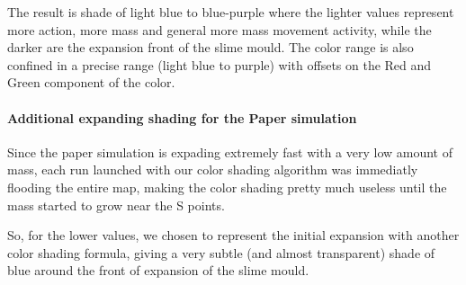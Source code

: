 The result is shade of light blue to blue-purple where the lighter values represent more action, more mass and general more mass movement activity, while the darker are the expansion front of the slime mould. The color range is also confined in a precise range (light blue to purple) with offsets on the Red and Green component of the color.

\paragraph{Additional expanding shading for the Paper simulation}

Since the paper simulation is expading extremely fast with a very low amount of mass, each run launched with our color shading algorithm was immediatly flooding the entire map, making the color shading pretty much useless until the mass started to grow near the S points.

So, for the lower values, we chosen to represent the initial expansion with another color shading formula, giving a very subtle (and almost transparent) shade of blue around the front of expansion of the slime mould.